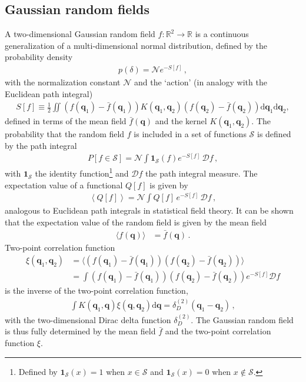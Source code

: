 \documentclass[a4paper, 11pt]{article}
\begin{document}
\subsection{Gaussian random fields}
A two-dimensional Gaussian random field $f:\mathbb{R}^2\to \mathbb{R}$ is a continuous generalization of a multi-dimensional normal distribution, defined by the probability density
\begin{align}
p(\delta) = \mathcal{N} e^{- S[f]}\,, \label{eq:functional_Distribution}
\end{align}
with the normalization constant $\mathcal{N}$ and the `action' (in analogy with the Euclidean path integral)
\begin{align}
S[f]\equiv \frac{1}{2} \iint (f(\bm{q}_1) - \bar{f}(\bm{q}_1)) K(\bm{q}_1,\bm{q}_2) (f(\bm{q}_2) -\bar{f}(\bm{q}_2))\mathrm{d}\bm{q}_1 \mathrm{d}\bm{q}_2,\label{eq:action}
\end{align}
defined in terms of the mean field $\bar{f}(\bm{q})$ and the kernel $K(\bm{q}_1,\bm{q}_2)$. The probability that the random field $f$ is included in a set of functions $\mathcal{S}$ is defined by the path integral
\begin{align}
P[f \in \mathcal{S}] = \mathcal{N} \int \bm{1}_\mathcal{S}(f) e^{-S[f]}\,\mathcal{D}f\,,
\end{align}
with $\bm{1}_\mathcal{S}$ the identity function\footnote{Defined by $\bm{1}_\mathcal{S}(x)=1$ when $x \in \mathcal{S}$ and $\bm{1}_\mathcal{S}(x)=0$ when $x \notin \mathcal{S}$.} and $\mathcal{D}f$ the path integral measure. The expectation value of a functional $Q[f]$ is given by
\begin{align}
\left\langle Q[f] \right\rangle = \mathcal{N}\int Q[f]\, e^{-S[f]}\,\mathcal{D}f\,,
\end{align}
analogous to Euclidean path integrals in statistical field theory. It can be shown that the expectation value of the random field is given by the mean field
\begin{align}
\langle f(\bm{q})\rangle &= \bar{f}(\bm{q})\,.
\end{align}
Two-point correlation function
\begin{align}
\xi(\bm{q}_1, \bm{q}_2) &= \langle (f(\bm{q}_1) - \bar{f}(\bm{q}_1)) (f(\bm{q}_2) - \bar{f}(\bm{q}_2))\rangle\\
&= \int (f(\bm{q}_1) - \bar{f}(\bm{q}_1)) (f(\bm{q}_2) - \bar{f}(\bm{q}_2)) e^{-S[f]}\mathcal{D}f
\end{align}
is the inverse of the two-point correlation function,
\begin{align}
\int K(\bm{q}_1,\bm{q}) \xi(\bm{q},\bm{q}_2) \mathrm{d}\bm{q}= \delta_D^{(2)}(\bm{q}_1-\bm{q}_2)\,,\label{eq:defK}
\end{align}
with the two-dimensional Dirac delta function $\delta_D^{(2)}$. The Gaussian random field is thus fully determined by the mean field $\bar{f}$ and the two-point correlation function $\xi$. 
\end{document}
